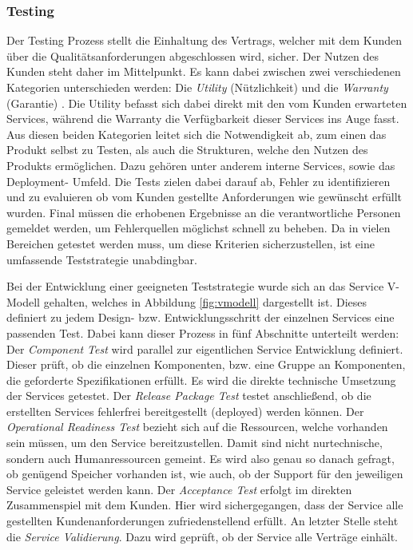 \documentclass[sigconf]{acmart}
\begin{document}
\subsubsection{Testing}
Der Testing Prozess stellt die Einhaltung des Vertrags, welcher
mit dem Kunden über die Qualitätsanforderungen abgeschlossen
wird, sicher. Der Nutzen des Kunden steht daher im Mittelpunkt. Es
kann dabei zwischen zwei verschiedenen Kategorien unterschieden
werden: Die \textit{Utility} (Nützlichkeit) und die \textit{Warranty} (Garantie) \cite{Beims.2015}. Die Utility befasst sich dabei direkt mit den vom Kunden erwarteten
Services, während die Warranty die Verfügbarkeit dieser
Services ins Auge fasst. Aus diesen beiden Kategorien leitet sich die
Notwendigkeit ab, zum einen das Produkt selbst zu Testen, als auch
die Strukturen, welche den Nutzen des Produkts ermöglichen. Dazu
gehören unter anderem interne Services, sowie das Deployment-
Umfeld. Die Tests zielen dabei darauf ab, Fehler zu identifizieren und zu evaluieren ob vom Kunden gestellte Anforderungen wie gewünscht
erfüllt wurden. Final müssen die erhobenen Ergebnisse an
die verantwortliche Personen gemeldet werden, um Fehlerquellen
möglichst schnell zu beheben. Da in vielen Bereichen getestet werden
muss, um diese Kriterien sicherzustellen, ist eine umfassende
Teststrategie unabdingbar. 

Bei der Entwicklung einer geeigneten Teststrategie wurde sich an das Service V-Modell gehalten, welches in Abbildung \ref{fig:vmodell} dargestellt ist. Dieses definiert zu jedem Design- bzw. Entwicklungsschritt der einzelnen Services eine passenden Test. Dabei kann dieser Prozess in fünf Abschnitte unterteilt werden: \\

Der \textit{Component Test} wird parallel zur eigentlichen Service Entwicklung definiert. Dieser prüft, ob die einzelnen Komponenten, bzw. eine Gruppe an Komponenten, die geforderte Spezifikationen erfüllt. Es wird die direkte technische Umsetzung der Services getestet. Der \textit{Release Package Test} testet anschließend, ob die erstellten Services fehlerfrei bereitgestellt (deployed) werden können. Der \textit{Operational Readiness Test} bezieht sich auf die Ressourcen, welche vorhanden sein müssen, um den Service bereitzustellen. Damit sind nicht nurtechnische, sondern auch Humanressourcen gemeint. Es wird also genau so danach gefragt, ob genügend Speicher vorhanden ist, wie auch, ob der Support für den jeweiligen Service geleistet werden kann. Der \textit{Acceptance Test} erfolgt im direkten Zusammenspiel mit dem Kunden. Hier wird sichergegangen, dass der Service alle gestellten Kundenanforderungen zufriedenstellend erfüllt. An letzter Stelle steht die \textit{Service Validierung}. Dazu wird geprüft, ob der Service alle Verträge einhält. 
\end{document}
